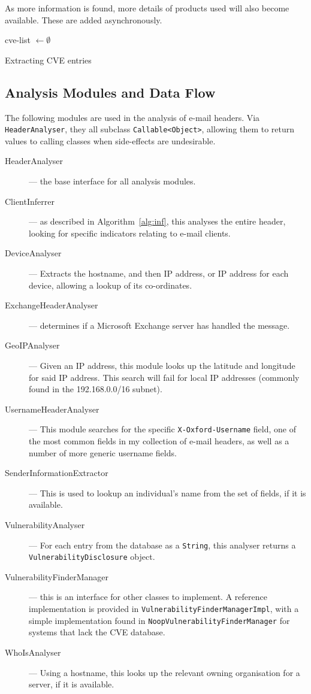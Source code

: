 As more information is found, more details of products used will also become
available.  These are added asynchronously.

\begin{algorithm}
	cve-list $\gets\emptyset$\;
	\;
	\caption{Extracting CVE entries}
\end{algorithm}

\subsection{Analysis Modules and Data Flow}

The following modules are used in the analysis of e-mail headers. Via \texttt{HeaderAnalyser}, they all subclass \texttt{Callable<Object>}, allowing them to return values to calling classes when side-effects are undesirable.

\begin{description}
	\item[HeaderAnalyser] --- the base interface for all analysis modules.
	\item[ClientInferrer] --- as described in Algorithm~\ref{alg:inf}, this analyses the entire header, looking for specific indicators relating to e-mail clients.
	\item[DeviceAnalyser] --- Extracts the hostname, and then IP address, or IP address for each device, allowing a lookup of its co-ordinates.
	\item[ExchangeHeaderAnalyser] --- determines if a Microsoft Exchange server has handled the message.
	\item[GeoIPAnalyser] --- Given an IP address, this module looks up the latitude and longitude for said IP address.  This search will fail for local IP addresses (commonly found in the 192.168.0.0/16 subnet).
	\item[UsernameHeaderAnalyser] --- This module searches for the specific \texttt{X-Oxford-Username} field, one of the most common fields in my collection of e-mail headers, as well as a number of more generic username fields.
	\item[SenderInformationExtractor] --- This is used to lookup an individual's name from the set of fields, if it is available.
	\item[VulnerabilityAnalyser] --- For each entry from the database as a \texttt{String}, this analyser returns a \texttt{VulnerabilityDisclosure} object.
	\item[VulnerabilityFinderManager] --- this is an interface for other classes to implement. A reference implementation is provided in \texttt{VulnerabilityFinderManagerImpl}, with a simple implementation found in \texttt{NoopVulnerabilityFinderManager} for systems that lack the CVE database.
	\item[WhoIsAnalyser] --- Using a hostname, this looks up the relevant owning organisation for a server, if it is available.
\end{description}

